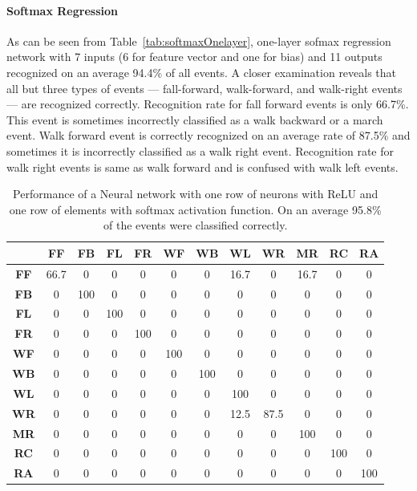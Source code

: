 \documentclass{IEEEtran}
\begin{document}
 \paragraph{Softmax Regression}
 \label{sec:SoftmaxRegression}
 As can be seen from Table~\ref{tab:softmaxOnelayer}, one-layer sofmax regression network with 7 inputs (6 for feature vector and one for bias) and 11 outputs recognized on an average 94.4\% of all  events. A closer examination reveals that all but three types of events --- fall-forward, walk-forward, and walk-right events  --- are recognized correctly. Recognition rate for fall forward events is only 66.7\%. This event is sometimes  incorrectly classified as a walk backward or a march event. Walk forward event is correctly recognized on an average rate of 87.5\% and sometimes it is incorrectly classified as a walk right event. Recognition rate for walk right events is same as walk forward and is confused with  walk left events.
\begin{table}[htb]
\caption{Performance of a Neural network with one row of neurons with ReLU and one row of elements with softmax activation function. On an average 95.8\% of the events were classified correctly.}
\label{tbl:neuralNetworkOneLayer}
\resizebox{\columnwidth}{!}
{
\begin{tabular}{|c|c|c|c|c|c|c|c|c|c|c|c|}
\hline 
& \textbf{FF} & \textbf{FB}  & \textbf{FL} & \textbf{FR} &  \textbf{WF} & 
\textbf{WB} & \textbf{WL} & \textbf{WR} & \textbf{MR} & 
\textbf{RC} & \textbf{RA} \\ \hline
\textbf{FF} & 66.7 &  0 &  0 &  0 &  0 &  0 &  16.7 &  0 &  16.7 &  0 &  0 \\ \hline
\textbf{FB} & 0 &  100 &  0 &  0 &  0 &  0 &  0 &  0 &  0 &  0 &  0 \\ \hline
\textbf{FL} & 0 &  0 &  100 &  0 &  0 &  0 &  0 &  0 &  0 &  0 &  0 \\ \hline
\textbf{FR} & 0 &  0 &  0 &  100 &  0 &  0 &  0 &  0 &  0 &  0 &  0 \\ \hline
\textbf{WF} & 0 &  0 &  0 &  0 &  100 &  0 &  0 &  0 &  0 &  0 &  0 \\ \hline
\textbf{WB} & 0 &  0 &  0 &  0 &  0 &  100 &  0 &  0 &  0 &  0 &  0 \\ \hline
\textbf{WL} & 0 &  0 &  0 &  0 &  0 &  0 &  100 &  0 &  0 &  0 &  0 \\ \hline
\textbf{WR} & 0 &  0 &  0 &  0 &  0 &  0 &  12.5 &  87.5 &  0 &  0 &  0 \\ \hline
\textbf{MR} & 0 &  0 &  0 &  0 &  0 &  0 &  0 &  0 &  100 &  0 &  0 \\ \hline
\textbf{RC} & 0 &  0 &  0 &  0 &  0 &  0 &  0 &  0 &  0 &  100 &  0 \\ \hline
\textbf{RA} & 0 &  0 &  0 &  0 &  0 &  0 &  0 &  0 &  0 &  0 &  100 \\ \hline
\end{tabular}
}
\end{table}
\end{document}
